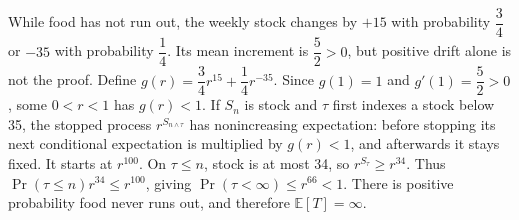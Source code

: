 While food has not run out, the weekly stock changes by $+15$ with probability $\dfrac{3}{4}$ or $-35$ with probability $\dfrac{1}{4}$. Its mean increment is $\dfrac{5}{2}>0$, but positive drift alone is not the proof. Define $g(r)=\dfrac{3}{4}r^{15}+\dfrac{1}{4}r^{-35}$. Since $g(1)=1$ and $g'(1)=\dfrac{5}{2}>0$, some $0<r<1$ has $g(r)<1$. If $S_n$ is stock and $\tau$ first indexes a stock below 35, the stopped process $r^{S_{n\wedge\tau}}$ has nonincreasing expectation: before stopping its next conditional expectation is multiplied by $g(r)<1$, and afterwards it stays fixed. It starts at $r^{100}$. On $\tau\le n$, stock is at most 34, so $r^{S_\tau}\ge r^{34}$. Thus $\Pr(\tau\le n)r^{34}\le r^{100}$, giving $\Pr(\tau<\infty)\le r^{66}<1$. There is positive probability food never runs out, and therefore $\boxed{\mathbb E[T]=\infty}$.

